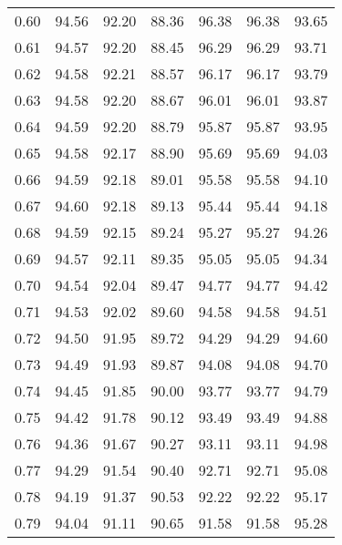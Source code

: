 \begin{tabular}{|c|c|c|c|c|c|c|}
      0.60 &     94.56 &     92.20 &      88.36 &   96.38 &      96.38 &         93.65 \\
      0.61 &     94.57 &     92.20 &      88.45 &   96.29 &      96.29 &         93.71 \\
      0.62 &     94.58 &     92.21 &      88.57 &   96.17 &      96.17 &         93.79 \\
      0.63 &     94.58 &     92.20 &      88.67 &   96.01 &      96.01 &         93.87 \\
      0.64 &     94.59 &     92.20 &      88.79 &   95.87 &      95.87 &         93.95 \\
      0.65 &     94.58 &     92.17 &      88.90 &   95.69 &      95.69 &         94.03 \\
      0.66 &     94.59 &     92.18 &      89.01 &   95.58 &      95.58 &         94.10 \\
      0.67 &     94.60 &     92.18 &      89.13 &   95.44 &      95.44 &         94.18 \\
      0.68 &     94.59 &     92.15 &      89.24 &   95.27 &      95.27 &         94.26 \\
      0.69 &     94.57 &     92.11 &      89.35 &   95.05 &      95.05 &         94.34 \\
      0.70 &     94.54 &     92.04 &      89.47 &   94.77 &      94.77 &         94.42 \\
      0.71 &     94.53 &     92.02 &      89.60 &   94.58 &      94.58 &         94.51 \\
      0.72 &     94.50 &     91.95 &      89.72 &   94.29 &      94.29 &         94.60 \\
      0.73 &     94.49 &     91.93 &      89.87 &   94.08 &      94.08 &         94.70 \\
      0.74 &     94.45 &     91.85 &      90.00 &   93.77 &      93.77 &         94.79 \\
      0.75 &     94.42 &     91.78 &      90.12 &   93.49 &      93.49 &         94.88 \\
      0.76 &     94.36 &     91.67 &      90.27 &   93.11 &      93.11 &         94.98 \\
      0.77 &     94.29 &     91.54 &      90.40 &   92.71 &      92.71 &         95.08 \\
      0.78 &     94.19 &     91.37 &      90.53 &   92.22 &      92.22 &         95.17 \\
      0.79 &     94.04 &     91.11 &      90.65 &   91.58 &      91.58 &         95.28 \\

\end{tabular}
